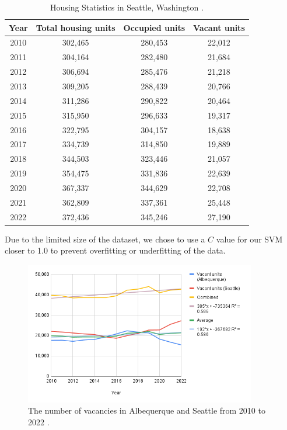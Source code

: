 \documentclass[12pt]{article}
\begin{document}
\begin{table}[H]
  \centering
  \begin{tabular}{|c c c c|}
    \hline
    Year & Total housing units & Occupied units & Vacant units \\ [0.5ex]
    \hline
    2010 & 302,465 & 280,453 & 22,012 \\
    2011 & 304,164 & 282,480 & 21,684 \\
    2012 & 306,694 & 285,476 & 21,218 \\
    2013 & 309,205 & 288,439 & 20,766 \\
    2014 & 311,286 & 290,822 & 20,464 \\
    2015 & 315,950 & 296,633 & 19,317 \\
    2016 & 322,795 & 304,157 & 18,638 \\
    2017 & 334,739 & 314,850 & 19,889 \\
    2018 & 344,503 & 323,446 & 21,057 \\
    2019 & 354,475 & 331,836 & 22,639 \\
    2020 & 367,337 & 344,629 & 22,708 \\
    2021 & 362,809 & 337,361 & 25,448 \\
    2022 & 372,436 & 345,246 & 27,190 \\ [1ex]
    \hline
  \end{tabular}
  \caption{Housing Statistics in Seattle, Washington \cite{Census2010ACSDP5Y2010.DP04}.}
\end{table}

\noindent
Due to the limited size of the dataset, we chose to use a $C$ value for our SVM closer to 1.0 to prevent overfitting or
underfitting of the data. 

\begin{figure}[H]
  \centering
  \includegraphics[width=0.9\textwidth]{vacancy}
  \caption{The number of vacancies in Albequerque and Seattle from 2010 to 2022 \cite{Census2010ACSDP1Y2010.DP04,Census2010ACSDP5Y2010.DP04}.}
\end{figure}
\end{document}
